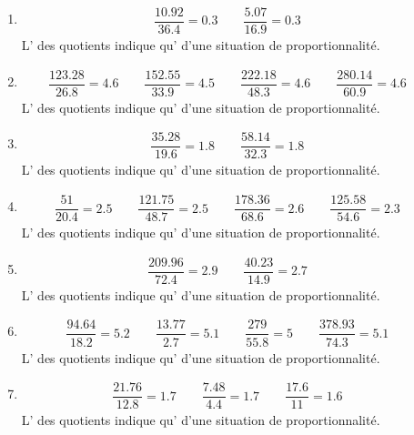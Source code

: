 {\begin{enumerate}
\item\begin{align*}
\dfrac{10.92}{36.4} = 0.3\qquad \dfrac{5.07}{16.9} = 0.3\qquad 
\end{align*}
L' des quotients indique qu' d'une situation de proportionnalité.

\item\begin{align*}
\dfrac{123.28}{26.8} = 4.6\qquad \dfrac{152.55}{33.9} = 4.5\qquad \dfrac{222.18}{48.3} = 4.6\qquad \dfrac{280.14}{60.9} = 4.6\qquad 
\end{align*}
L' des quotients indique qu' d'une situation de proportionnalité.

\item\begin{align*}
\dfrac{35.28}{19.6} = 1.8\qquad \dfrac{58.14}{32.3} = 1.8\qquad 
\end{align*}
L' des quotients indique qu' d'une situation de proportionnalité.

\item\begin{align*}
\dfrac{51}{20.4} = 2.5\qquad \dfrac{121.75}{48.7} = 2.5\qquad \dfrac{178.36}{68.6} = 2.6\qquad \dfrac{125.58}{54.6} = 2.3\qquad 
\end{align*}
L' des quotients indique qu' d'une situation de proportionnalité.

\item\begin{align*}
\dfrac{209.96}{72.4} = 2.9\qquad \dfrac{40.23}{14.9} = 2.7\qquad 
\end{align*}
L' des quotients indique qu' d'une situation de proportionnalité.

\item\begin{align*}
\dfrac{94.64}{18.2} = 5.2\qquad \dfrac{13.77}{2.7} = 5.1\qquad \dfrac{279}{55.8} = 5\qquad \dfrac{378.93}{74.3} = 5.1\qquad 
\end{align*}
L' des quotients indique qu' d'une situation de proportionnalité.

\item\begin{align*}
\dfrac{21.76}{12.8} = 1.7\qquad \dfrac{7.48}{4.4} = 1.7\qquad \dfrac{17.6}{11} = 1.6\qquad 
\end{align*}
L' des quotients indique qu' d'une situation de proportionnalité.


\end{enumerate}}
